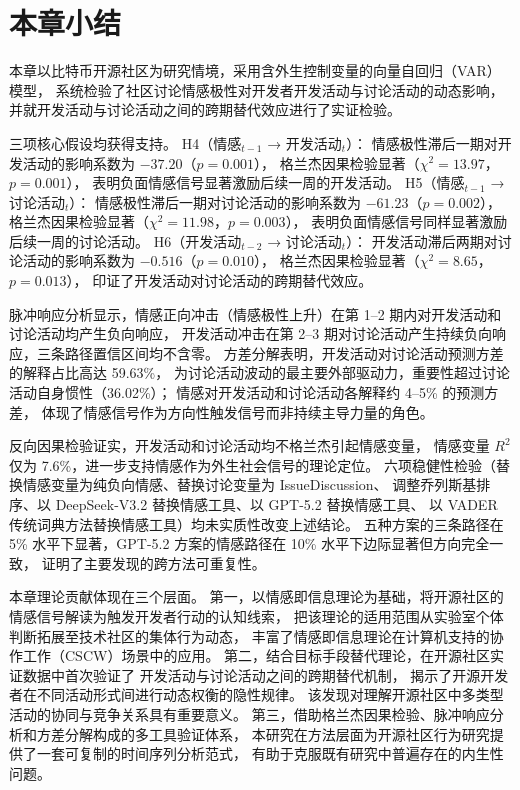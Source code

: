 \section{本章小结}

本章以比特币开源社区为研究情境，采用含外生控制变量的向量自回归（VAR）模型，
系统检验了社区讨论情感极性对开发者开发活动与讨论活动的动态影响，
并就开发活动与讨论活动之间的跨期替代效应进行了实证检验。

三项核心假设均获得支持。
H4（情感$_{t-1}$ → 开发活动$_t$）：
情感极性滞后一期对开发活动的影响系数为 $-37.20$（$p = 0.001$），
格兰杰因果检验显著（$\chi^2 = 13.97$，$p = 0.001$），
表明负面情感信号显著激励后续一周的开发活动。
H5（情感$_{t-1}$ → 讨论活动$_t$）：
情感极性滞后一期对讨论活动的影响系数为 $-61.23$（$p = 0.002$），
格兰杰因果检验显著（$\chi^2 = 11.98$，$p = 0.003$），
表明负面情感信号同样显著激励后续一周的讨论活动。
H6（开发活动$_{t-2}$ → 讨论活动$_t$）：
开发活动滞后两期对讨论活动的影响系数为 $-0.516$（$p = 0.010$），
格兰杰因果检验显著（$\chi^2 = 8.65$，$p = 0.013$），
印证了开发活动对讨论活动的跨期替代效应。

脉冲响应分析显示，情感正向冲击（情感极性上升）在第 1--2 期内对开发活动和讨论活动均产生负向响应，
开发活动冲击在第 2--3 期对讨论活动产生持续负向响应，三条路径置信区间均不含零。
方差分解表明，开发活动对讨论活动预测方差的解释占比高达 59.63\%，
为讨论活动波动的最主要外部驱动力，重要性超过讨论活动自身惯性（36.02\%）；
情感对开发活动和讨论活动各解释约 4--5\% 的预测方差，
体现了情感信号作为方向性触发信号而非持续主导力量的角色。

反向因果检验证实，开发活动和讨论活动均不格兰杰引起情感变量，
情感变量 $R^2$ 仅为 7.6\%，进一步支持情感作为外生社会信号的理论定位。
六项稳健性检验（替换情感变量为纯负向情感、替换讨论变量为 IssueDiscussion、
调整乔列斯基排序、以 DeepSeek-V3.2 替换情感工具、以 GPT-5.2 替换情感工具、
以 VADER 传统词典方法替换情感工具）均未实质性改变上述结论。
五种方案的三条路径在 5\% 水平下显著，GPT-5.2 方案的情感路径在 10\% 水平下边际显著但方向完全一致，
证明了主要发现的跨方法可重复性。

本章理论贡献体现在三个层面。
第一，以情感即信息理论为基础，将开源社区的情感信号解读为触发开发者行动的认知线索，
把该理论的适用范围从实验室个体判断拓展至技术社区的集体行为动态，
丰富了情感即信息理论在计算机支持的协作工作（CSCW）场景中的应用。
第二，结合目标手段替代理论，在开源社区实证数据中首次验证了
开发活动与讨论活动之间的跨期替代机制，
揭示了开源开发者在不同活动形式间进行动态权衡的隐性规律。
该发现对理解开源社区中多类型活动的协同与竞争关系具有重要意义。
第三，借助格兰杰因果检验、脉冲响应分析和方差分解构成的多工具验证体系，
本研究在方法层面为开源社区行为研究提供了一套可复制的时间序列分析范式，
有助于克服既有研究中普遍存在的内生性问题。

